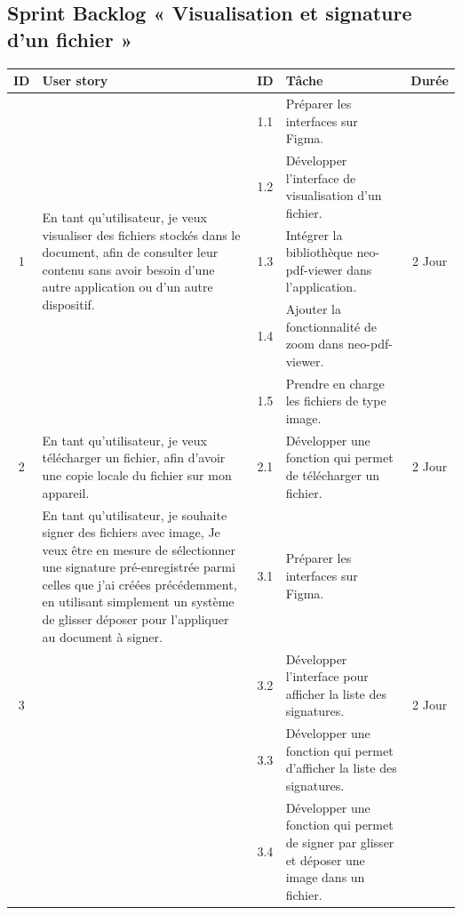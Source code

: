 \subsection{Sprint Backlog « Visualisation et signature d'un fichier »}

\begin{adjustwidth}{-1cm}{}
    
    \begin{longtable}{|c|p{6cm}|c|p{6cm}|c|}
      \hline
      \textbf{ID} & \textbf{User story} & \textbf{ID}  & \textbf{Tâche} & \textbf{Durée} \\
      \hline
      \multirow{5}{*}{1} & \multirow{5}{6cm}{En tant qu'utilisateur, je veux visualiser des fichiers stockés dans le document, afin de consulter leur contenu sans avoir besoin d'une autre application ou d'un autre dispositif.} & 1.1 & Préparer les interfaces sur Figma. & \multirow{5}{*}{2 Jour} \\
      \cline{3-4}
      & & 1.2 & Développer l'interface de visualisation d'un fichier. & \\
      \cline{3-4}
      & & 1.3 & Intégrer la bibliothèque neo-pdf-viewer dans l'application. & \\
      \cline{3-4}
      & & 1.4 & Ajouter la fonctionnalité de zoom dans neo-pdf-viewer. & \\
      \cline{3-4}
      & & 1.5 & Prendre en charge les fichiers de type image. & \\
      \cline{1-5}

      \multirow{1}{*}{2} & En tant qu'utilisateur, je veux télécharger un fichier, afin d'avoir une copie locale du fichier sur mon appareil. & 2.1 & Développer une fonction qui permet de télécharger un fichier. & \multirow{1}{*}{2 Jour} \\
      \cline{1-5}

      \multirow{4}{*}{3} & En tant qu'utilisateur, je souhaite signer des fichiers avec image, Je veux être en mesure de sélectionner une signature pré-enregistrée parmi celles que j'ai créées précédemment, en utilisant simplement un système de glisser déposer pour l'appliquer au document à signer.& 3.1 & Préparer les interfaces sur Figma. & \multirow{4}{*}{2 Jour} \\
      \cline{3-4}
      & & 3.2 & Développer l'interface pour afficher la liste des signatures. & \\
      \cline{3-4}
      & & 3.3 & Développer une fonction qui permet d'afficher la liste des signatures. & \\
      \cline{3-4}
      & & 3.4 & Développer une fonction qui permet de signer par glisser et déposer une image dans un fichier. & \\
      \cline{1-5}


\end{longtable}
\end{adjustwidth}
